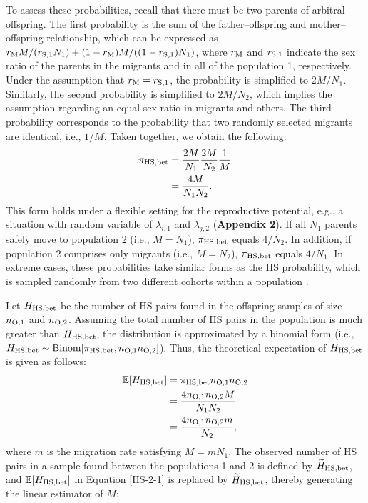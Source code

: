 \documentclass[12pt, English]{article}
\begin{document}
\begin{spacing}{1.9}
To assess these probabilities, recall that there must be two parents of arbitral offspring. The first probability is the sum of the father--offspring and mother--offspring relationship, which can be expressed as $r_{\rm M}M/(r_{\rm S,1}N_{1}) + (1 - r_{\rm M})M/((1-r_{\rm S,1})N_{1})$, where $r_{\rm M}$ and $r_{\rm S,1}$ indicate the sex ratio of the parents in the migrants and in all of the population 1, respectively. Under the assumption that $r_{\rm M} = r_{\rm S,1}$, the probability is simplified to $2M/N_{1}$. Similarly, the second probability is simplified to $2M/N_{2}$, which implies the assumption regarding an equal sex ratio in migrants and others. The third probability corresponds to the probability that two randomly selected migrants are identical, i.e., $1/M$. Taken together, we obtain the following: 
\begin{align}
\pi_{\rm HS,bet} &= \frac{2M}{N_{1}} \frac{2M}{N_{2}} \frac{1}{M} \nonumber\\
&= \frac{4M}{N_{1}N_{2}}.
\label{HS-1}
\end{align}
This form holds under a flexible setting for the reproductive potential, e.g., a situation with random variable of $\lambda_{i,1}$ and $\lambda_{j,2}$ ({\bf Appendix 2}). If all $N_1$ parents safely move to population 2 (i.e., $M = N_1$), $\pi_{\rm HS,bet}$ equals $4/N_2$. In addition, if population 2 comprises only migrants (i.e., $M = N_2$), $\pi_{\rm HS,bet}$ equals $4/N_1$. In extreme cases, these probabilities take similar forms as the HS probability, which is sampled randomly from two different cohorts within a population \cite[]{bravington2016close}. 

Let $H_{\rm HS,bet}$ be the number of HS pairs found in the offspring samples of size $n_{\rm O, 1}$ and $n_{\rm O, 2}$. Assuming the total number of HS pairs in the population is much greater than $H_{\rm HS,bet}$, the distribution is approximated by a binomial form (i.e., $H_{\rm HS,bet} \sim {\rm Binom}[\pi_{\rm HS,bet}, n_{\rm O, 1} n_{\rm O, 2}]$). Thus, the theoretical expectation of $H_{\rm HS,bet}$ is given as follows: 
\begin{align}
\mathbb{E}[H_{\rm HS, bet}] &= \pi_{\rm HS,bet} n_{\rm O, 1} n_{\rm O, 2} \nonumber\\
&= \frac{ 4 n_{\rm O, 1} n_{\rm O, 2} M } { N_{1} N_{2} } \label{HS-2-1}\\
&= \frac{ 4 n_{\rm O, 1} n_{\rm O, 2} m } { N_{2} },
\label{HS-2-2}
\end{align}
where $m$ is the migration rate satisfying $M = mN_{1}$. The observed number of HS pairs in a sample found between the populations 1 and 2 is defined by $\widetilde{H}_{\rm HS, bet}$, and $\mathbb{E}[H_{\rm HS, bet}]$ in Equation \ref{HS-2-1} is replaced by $\widetilde{H}_{\rm HS, bet}$, thereby generating the linear estimator of $M$:


\end{spacing}
\end{document}
